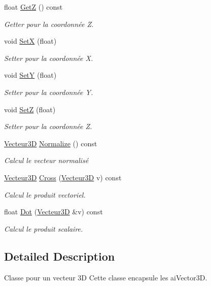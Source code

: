 \begin{DoxyCompactItemize}
float \hyperlink{class_vecteur3_d_a001bd37a2d98c071b59d168057735eeb}{GetZ} () const 
\begin{DoxyCompactList}\small\item\em Getter pour la coordonnée Z. \end{DoxyCompactList}\item 
void \hyperlink{class_vecteur3_d_a9e987e98ee43903a5281752bd310a764}{SetX} (float)
\begin{DoxyCompactList}\small\item\em Setter pour la coordonnée X. \end{DoxyCompactList}\item 
void \hyperlink{class_vecteur3_d_aaef5dfb35864a47ac7eb986cead20c71}{SetY} (float)
\begin{DoxyCompactList}\small\item\em Setter pour la coordonnée Y. \end{DoxyCompactList}\item 
void \hyperlink{class_vecteur3_d_a0b20935a9e30452ea51da98fc8878181}{SetZ} (float)
\begin{DoxyCompactList}\small\item\em Setter pour la coordonnée Z. \end{DoxyCompactList}\item 
\hyperlink{class_vecteur3_d}{Vecteur3D} \hyperlink{class_vecteur3_d_a3da112b573b37eb696dd17c7f3a4230f}{Normalize} () const 
\begin{DoxyCompactList}\small\item\em Calcul le vecteur normalisé \end{DoxyCompactList}\item 
\hyperlink{class_vecteur3_d}{Vecteur3D} \hyperlink{class_vecteur3_d_a7050066f71a250c11b81e58e1466b389}{Cross} (\hyperlink{class_vecteur3_d}{Vecteur3D} v) const 
\begin{DoxyCompactList}\small\item\em Calcul le produit vectoriel. \end{DoxyCompactList}\item 
float \hyperlink{class_vecteur3_d_aa428d49b67ee120ae871cec35fd43805}{Dot} (\hyperlink{class_vecteur3_d}{Vecteur3D} \&v) const 
\begin{DoxyCompactList}\small\item\em Calcul le produit scalaire. \end{DoxyCompactList}\end{DoxyCompactItemize}


\subsection{Detailed Description}
Classe pour un vecteur 3D Cette classe encapsule les ai\+Vector3D. 

